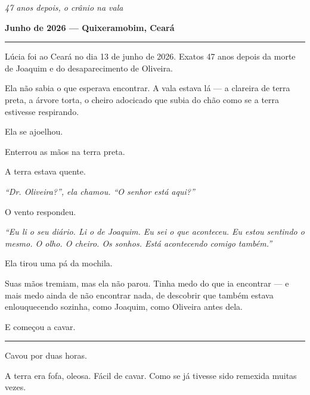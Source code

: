 
\noindent \textit{47 anos depois, o crânio na vala}

\noindent \textbf{Junho de 2026 --- Quixeramobim, Ceará}

\vspace{0.5em}\noindent\rule{\textwidth}{0.5pt}\vspace{0.5em}

\noindent Lúcia foi ao Ceará no dia 13 de junho de 2026. Exatos 47 anos depois da morte de Joaquim e do desaparecimento de Oliveira.

\noindent Ela não sabia o que esperava encontrar. A vala estava lá --- a clareira de terra preta, a árvore torta, o cheiro adocicado que subia do chão como se a terra estivesse respirando.

\noindent Ela se ajoelhou.

\noindent Enterrou as mãos na terra preta.

\noindent A terra estava quente.

\noindent \textit{\textquotedblleft{}Dr. Oliveira?\textquotedblright{}\textit{, ela chamou. }\textquotedblleft{}O senhor está aqui?\textquotedblright{}}

\noindent O vento respondeu.

\noindent \textit{\textquotedblleft{}Eu li o seu diário. Li o de Joaquim. Eu sei o que aconteceu. Eu estou sentindo o mesmo. O olho. O cheiro. Os sonhos. Está acontecendo comigo também.\textquotedblright{}}

\noindent Ela tirou uma pá da mochila.

\noindent Suas mãos tremiam, mas ela não parou. Tinha medo do que ia encontrar --- e mais medo ainda de não encontrar nada, de descobrir que também estava enlouquecendo sozinha, como Joaquim, como Oliveira antes dela.

\noindent E começou a cavar.

\vspace{0.5em}\noindent\rule{\textwidth}{0.5pt}\vspace{0.5em}

\noindent Cavou por duas horas.

\noindent A terra era fofa, oleosa. Fácil de cavar. Como se já tivesse sido remexida muitas vezes.

